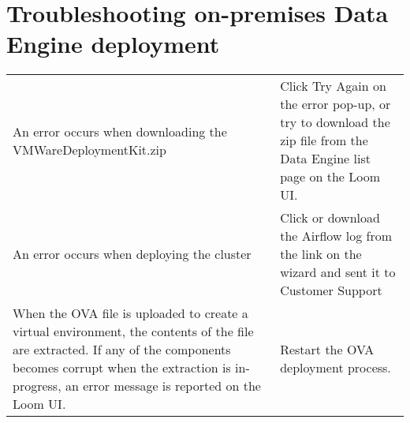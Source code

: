 \documentclass[letterpaper,10pt,english]{sphinxmanual}
\begin{document}
\chapter{Troubleshooting on-premises Data Engine deployment}
\label{\detokenize{on_prem_dp_install_mcdmp:troubleshooting-on-premises-data-engine-deployment}}


\begin{savenotes}\sphinxattablestart
\centering
\begin{tabulary}{\linewidth}[t]{|T|T|}
\hline
{}\relax &\relax \\
\hline
An error occurs when
downloading the
VMWareDeploymentKit.zip
&
Click Try Again on the error pop-up,
or try to download the zip file from
the Data Engine list page on the Loom
UI.
\\
\hline
An error occurs when
deploying  the cluster
&
Click  or download the
Airflow log from the link on the
wizard and sent it to Customer Support
\\
\hline
When the OVA file is
uploaded to create a
virtual environment,
the contents of the
file are extracted.
If any of the
components becomes
corrupt when the
extraction is
in-progress, an error
message is reported on
the Loom UI.
&
Restart the OVA deployment process.
\\
\hline
\end{tabulary}
\par
\sphinxattableend\end{savenotes}



\renewcommand{\indexname}{Index}
\printindex
\end{document}
